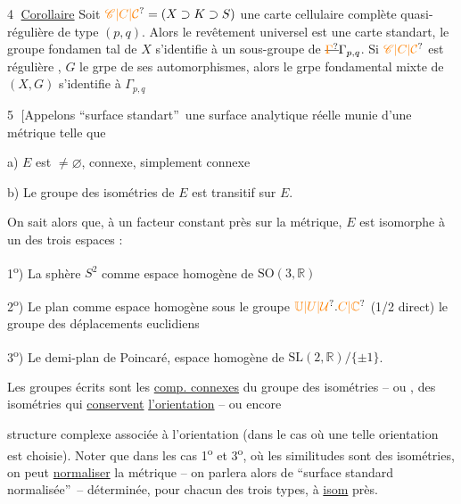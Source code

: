 \textcircled{4} \uline{Corollaire} Soit $\unsure{\mathscr C|C|\mathcal C}=(X\supset K\supset S)$ une carte cellulaire complète  quasi-régulière de type $(p,q)$. Alors le revêtement universel  est  une carte standart, le groupe fondamen%
%
tal de $X$ s'identifie à un sous-groupe de $\deleted{\unsure{\Gamma}}\Gamma_{p,q}$. Si $\unsure{\mathscr C|C|\mathcal C}$ est régulière , $G$ le grpe de ses automorphismes, alors le grpe fondamental mixte de $(X,G)$ s'identifie à $\Gamma_{p,q}$

\textcircled{5} [Appelons  \textquotedblleft surface  standart\textquotedblright\ une surface   analytique réelle munie d'une métrique  telle que

a) $E$ est $\ne\varnothing$, connexe, simplement connexe

b) Le groupe des isométries de $E$ est transitif sur $E$.

 On sait alors que, à un facteur constant près sur la métrique, $E$ est isomorphe à un des trois espaces :

1\textsuperscript{o}) La sphère $S^2$ comme espace homogène de $\mathrm{SO}(3,\mathbb R)$

2\textsuperscript{o}) Le plan    comme espace homogène sous le groupe $\unsure{\mathbb U|U|\mathcal U}.\unsure{C|\mathbb C}$ (1/2 direct) le groupe des déplacements euclidiens

3\textsuperscript{o}) Le demi-plan de Poincaré,  espace homogène de $\mathrm{SL}(2,\mathbb R)/\{\pm1\}$.

Les groupes écrits sont les \uline{comp. connexes} du groupe des isométries -- ou ,  des isométries qui \uline{conservent} \uline{l'orientation} -- ou encore 

structure complexe associée à l'orientation (dans le cas où une telle orientation est choisie). Noter que dans les cas 1\textsuperscript{o} et 3\textsuperscript{o}, où les similitudes sont des isométries, on peut \uline{normaliser} la métrique -- on parlera alors de \textquotedblleft surface standard normalisée\textquotedblright\ -- déterminée, pour chacun des  trois types, à \uline{isom} près.

